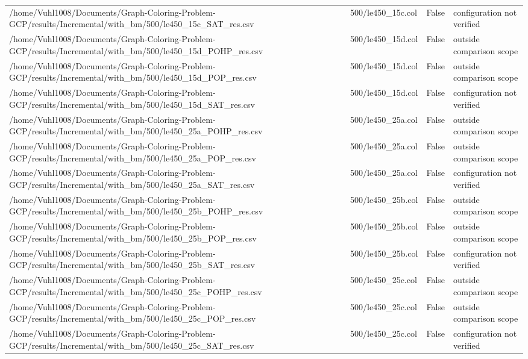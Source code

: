 \begin{table}[htbp]
\begin{tabular}{llll}
/home/Vuhl1008/Documents/Graph-Coloring-Problem-GCP/results/Incremental/with\_bm/500/le450\_15c\_SAT\_res.csv & 500/le450\_15c.col & False & configuration not verified \\
/home/Vuhl1008/Documents/Graph-Coloring-Problem-GCP/results/Incremental/with\_bm/500/le450\_15d\_POHP\_res.csv & 500/le450\_15d.col & False & outside comparison scope \\
/home/Vuhl1008/Documents/Graph-Coloring-Problem-GCP/results/Incremental/with\_bm/500/le450\_15d\_POP\_res.csv & 500/le450\_15d.col & False & outside comparison scope \\
/home/Vuhl1008/Documents/Graph-Coloring-Problem-GCP/results/Incremental/with\_bm/500/le450\_15d\_SAT\_res.csv & 500/le450\_15d.col & False & configuration not verified \\
/home/Vuhl1008/Documents/Graph-Coloring-Problem-GCP/results/Incremental/with\_bm/500/le450\_25a\_POHP\_res.csv & 500/le450\_25a.col & False & outside comparison scope \\
/home/Vuhl1008/Documents/Graph-Coloring-Problem-GCP/results/Incremental/with\_bm/500/le450\_25a\_POP\_res.csv & 500/le450\_25a.col & False & outside comparison scope \\
/home/Vuhl1008/Documents/Graph-Coloring-Problem-GCP/results/Incremental/with\_bm/500/le450\_25a\_SAT\_res.csv & 500/le450\_25a.col & False & configuration not verified \\
/home/Vuhl1008/Documents/Graph-Coloring-Problem-GCP/results/Incremental/with\_bm/500/le450\_25b\_POHP\_res.csv & 500/le450\_25b.col & False & outside comparison scope \\
/home/Vuhl1008/Documents/Graph-Coloring-Problem-GCP/results/Incremental/with\_bm/500/le450\_25b\_POP\_res.csv & 500/le450\_25b.col & False & outside comparison scope \\
/home/Vuhl1008/Documents/Graph-Coloring-Problem-GCP/results/Incremental/with\_bm/500/le450\_25b\_SAT\_res.csv & 500/le450\_25b.col & False & configuration not verified \\
/home/Vuhl1008/Documents/Graph-Coloring-Problem-GCP/results/Incremental/with\_bm/500/le450\_25c\_POHP\_res.csv & 500/le450\_25c.col & False & outside comparison scope \\
/home/Vuhl1008/Documents/Graph-Coloring-Problem-GCP/results/Incremental/with\_bm/500/le450\_25c\_POP\_res.csv & 500/le450\_25c.col & False & outside comparison scope \\
/home/Vuhl1008/Documents/Graph-Coloring-Problem-GCP/results/Incremental/with\_bm/500/le450\_25c\_SAT\_res.csv & 500/le450\_25c.col & False & configuration not verified \\

\end{tabular}
\end{table}

